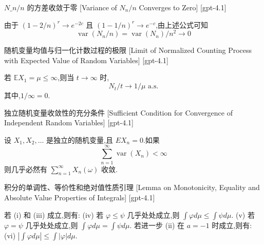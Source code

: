 \documentclass[UTF8]{ctexart}
\begin{document}
    \begin{crl}
        {$N\_n/n$ 的方差收敛于零}
        [Variance of $N_n/n$ Converges to Zero]
        [gpt-4.1]
        
由于 $(1 - 2/n)^r \to e^{-2c}$ 且 $(1 - 1/n)^r \to e^{-c}$,由上述公式可知
\[
\operatorname{var}(N_n/n) = \operatorname{var}(N_n)/n^2 \to 0
\]

    \end{crl}
    
    
    
    \begin{thm}
        {随机变量均值与归一化计数过程的极限}
        [Limit of Normalized Counting Process with Expected Value of Random Variables]
        [gpt-4.1]
        
若 $\mathbb{E} X_{1} = \mu \leq \infty$,则当 $t \to \infty$ 时,
\[
N_{t} / t \to 1 / \mu \text{ a.s.}
\]
其中,$1 / \infty = 0$.

    \end{thm}
    
    
    
    \begin{thm}
        {独立随机变量收敛性的充分条件}
        [Sufficient Condition for Convergence of Independent Random Variables]
        [gpt-4.1]
        
设 $X_{1}, X_{2}, \dots$ 是独立的随机变量,且 $E X_{n} = 0$.如果
\[
\sum_{n=1}^{\infty} \operatorname{var}\left(X_{n}\right) < \infty
\]
则几乎必然有 $\sum_{n=1}^{\infty} X_{n}(\omega)$ 收敛.

    \end{thm}
    
    
    
    \begin{lma}
        {积分的单调性、等价性和绝对值性质引理}
        [Lemma on Monotonicity, Equality and Absolute Value Properties of Integrals]
        [gpt-4.1]
        
若 (i) 和 (iii) 成立,则有:
(iv) 若 $\varphi \leq \psi$ 几乎处处成立,则 $\int \varphi d\mu \leq \int \psi d\mu$.
(v) 若 $\varphi = \psi$ 几乎处处成立,则 $\int \varphi d\mu = \int \psi d\mu$.
若进一步 (ii) 在 $a = -1$ 时成立,则有:
(vi) $|\int \varphi d\mu| \leq \int |\varphi| d\mu$.

    \end{lma}
    
\end{document}
